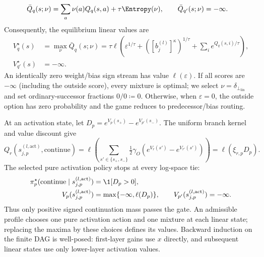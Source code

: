 \begin{definition}
\begin{align}
 \bar Q_q(s;\nu)&=\sum_a\nu(a)Q_q(s,a)+\tau\Entropy(\nu),\qquad \bar Q_{q'}(s;\nu)=-\infty.
\end{align}
Consequently, the equilibrium linear values are
\begin{align}\label{ptnb:eq:routing-linear-value}
 V_q^\star(s)&=\max_\nu\bar Q_q(s;\nu)
 =\tau\ell\!\left(\varepsilon^{1/\tau}+([b_j^{(l)}]^\kappa)^{1/\tau}+\sum_i e^{Q_q(s,i)/\tau}\right),\nonumber\\
 V_{q'}^\star(s)&=-\infty.
\end{align}
An identically zero weight/bias sign stream has value $\ell(\varepsilon)$. If all scores are $-\infty$ (including the outside score), every mixture is optimal; we select $\nu=\delta_{\perp_{\mathrm{lin}}}$ and set ordinary-successor fractions $0/0\coloneqq0$. Otherwise, when $\varepsilon=0$, the outside option has zero probability and the game reduces to predecessor/bias routing.

At an activation state, let $D_p=e^{V_p(s_+)}-e^{V_{p'}(s_-)}$. The uniform branch kernel and value discount give
\begin{equation}\label{ptnb:eq:routing-activation-continue}
 Q_r(s_{j,p}^{(l,\mathrm{act})},\mathrm{continue})
 =\ell\!\left(\sum_{s'\in\{s_+,s_-\}}\tfrac12\gamma_O
       (e^{V_r(s')}-e^{V_{r'}(s')})\right)=\ell(\xi_{r,p}D_p).
\end{equation}
The selected pure activation policy stops at every log-space tie:
\begin{align}\label{ptnb:eq:routing-activation-value}
 \pi_p^\star(\mathrm{continue}\mid s_{j,p}^{(l,\mathrm{act})})&=\1[D_p>0],\nonumber\\
 V_p(s_{j,p}^{(l,\mathrm{act})})&=\max\{-\infty,\ell(D_p)\},
 \qquad V_{p'}(s_{j,p}^{(l,\mathrm{act})})=-\infty.
\end{align}
Thus only positive signed continuation mass passes the gate. An admissible profile chooses one pure activation action and one mixture at each linear state; replacing the maxima by these choices defines its values. Backward induction on the finite DAG is well-posed: first-layer gains use $x$ directly, and subsequent linear states use only lower-layer activation values.
\end{definition}

